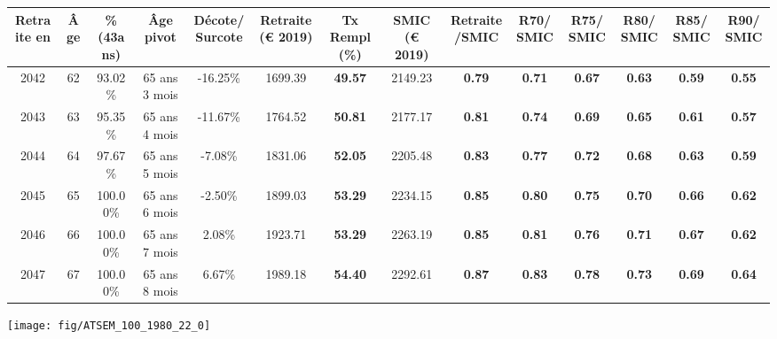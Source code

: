\begin{adjustbox}{max width=\textwidth} 
\begin{tabular}[htb]{|c|c||c|c|c||c|c||c|c||c|c|c|c|c|} 
\hline 
 Retraite en &  Âge &  \%(43ans) &  Âge pivot &  Décote/Surcote &  Retraite (\euro{} 2019) &  Tx Rempl(\%) &  SMIC (\euro{} 2019) &  Retraite/SMIC &  R70/SMIC &  R75/SMIC &  R80/SMIC &  R85/SMIC &  R90/SMIC \\ 
\hline \hline 
 2042 &  62 &  93.02\% &  65 ans 3 mois &  -16.25\% &  1699.39 &  {\bf 49.57} &  2149.23 &  {\bf {\color{red} 0.79}} &  {\bf {\color{red} 0.71}} &  {\bf {\color{red} 0.67}} &  {\bf {\color{red} 0.63}} &  {\bf {\color{red} 0.59}} &  {\bf {\color{red} 0.55}} \\ 
\hline 
 2043 &  63 &  95.35\% &  65 ans 4 mois &  -11.67\% &  1764.52 &  {\bf 50.81} &  2177.17 &  {\bf {\color{red} 0.81}} &  {\bf {\color{red} 0.74}} &  {\bf {\color{red} 0.69}} &  {\bf {\color{red} 0.65}} &  {\bf {\color{red} 0.61}} &  {\bf {\color{red} 0.57}} \\ 
\hline 
 2044 &  64 &  97.67\% &  65 ans 5 mois &  -7.08\% &  1831.06 &  {\bf 52.05} &  2205.48 &  {\bf {\color{red} 0.83}} &  {\bf {\color{red} 0.77}} &  {\bf {\color{red} 0.72}} &  {\bf {\color{red} 0.68}} &  {\bf {\color{red} 0.63}} &  {\bf {\color{red} 0.59}} \\ 
\hline 
 2045 &  65 &  100.00\% &  65 ans 6 mois &  -2.50\% &  1899.03 &  {\bf 53.29} &  2234.15 &  {\bf {\color{red} 0.85}} &  {\bf {\color{red} 0.80}} &  {\bf {\color{red} 0.75}} &  {\bf {\color{red} 0.70}} &  {\bf {\color{red} 0.66}} &  {\bf {\color{red} 0.62}} \\ 
\hline 
 2046 &  66 &  100.00\% &  65 ans 7 mois &  2.08\% &  1923.71 &  {\bf 53.29} &  2263.19 &  {\bf {\color{red} 0.85}} &  {\bf {\color{red} 0.81}} &  {\bf {\color{red} 0.76}} &  {\bf {\color{red} 0.71}} &  {\bf {\color{red} 0.67}} &  {\bf {\color{red} 0.62}} \\ 
\hline 
 2047 &  67 &  100.00\% &  65 ans 8 mois &  6.67\% &  1989.18 &  {\bf 54.40} &  2292.61 &  {\bf {\color{red} 0.87}} &  {\bf {\color{red} 0.83}} &  {\bf {\color{red} 0.78}} &  {\bf {\color{red} 0.73}} &  {\bf {\color{red} 0.69}} &  {\bf {\color{red} 0.64}} \\ 
\hline 
\hline 
\end{tabular} 
\end{adjustbox} 
 
 \vspace{0.1cm} 

 {\hspace{-2.2cm}\texttt{[image: fig/ATSEM\_100\_1980\_22\_0]}} 

